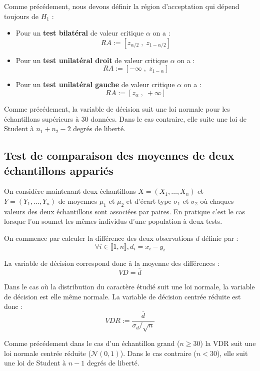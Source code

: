 Comme précédement, nous devons définir la région d'acceptation qui dépend toujours de $H_1$ : 
\begin{itemize}
    \item Pour un \textbf{test bilatéral} de valeur critique $\alpha$ on a :
        \[ RA := [z_{\alpha/2} \; , \; z_{1 - \alpha/2}] \] 
    \item Pour un \textbf{test unilatéral droit} de valeur critique $\alpha$ on a : 
        \[ RA := [- \infty \; , \; z_{1-\alpha}] \] 
    \item Pour un \textbf{test unilatéral gauche} de valeur critique $\alpha$ on a :
        \[ RA := [z_\alpha \; , \; + \infty ] \] 
\end{itemize}

\begin{remark}
    Comme précédement, la variable de décision suit une loi normale pour les échantillons supérieurs à 30 données. 
    Dans le cas contraire, elle suite une loi de Student à $n_1 + n_2 -2$ degrés de liberté. 
\end{remark}



\subsection{Test de comparaison des moyennes de deux échantillons appariés}

On considère maintenant deux échantillons $X = (X_1, \dots, X_n)$ et $Y = (Y_1, \dots, Y_n)$ de moyennes $\mu_1$ et $\mu_2$ et d'écart-type 
$\sigma_1$ et $\sigma_2$ où chaques valeurs des deux échantillons sont associées par paires. 
En pratique c'est le cas lorsque l'on soumet les mêmes individus d'une population à deux tests. 

On commence par calculer la différence des deux observations $d$ définie par : 
    \[ \forall i \in \llbracket 1, n \rrbracket, d_i = x_i - y_i \] 

La variable de décision correspond donc à la moyenne des différences : 
    \[ VD = \overline{d} \] 

Dans le cas où la distribution du caractère étudié suit une loi normale, la variable de décision est elle même 
normale. La variable de décision centrée réduite est donc :
    \[ VDR := \frac{\overline{d}}{\sigma_d / \sqrt{n}} \] 

Comme précédement dans le cas d'un échantillon grand ($ n \geqslant 30$) la VDR suit une loi normale centrée réduite 
($ \mathcal{N}(0,1)$). Dans le cas contraire ($ n < 30$), elle suit une loi de Student à $n -1$ degrés de liberté. 


